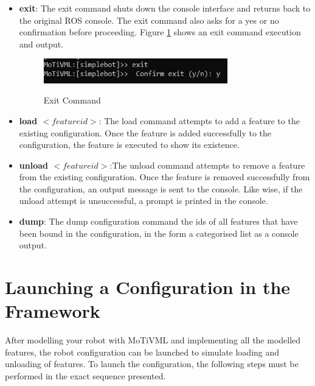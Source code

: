 \documentclass{article}
\begin{document}
\begin{itemize}
	\item \textbf{exit}: The exit command shuts down the console interface and returns back to the original ROS console. The exit command also asks for a yes or no confirmation before proceeding. Figure \ref{exit} shows an exit command execution and output.
	\begin{figure}[H]
		\caption{Exit Command}
		\centering
		\includegraphics[width=8cm]{images/exit.png}
		\label{exit}
	\end{figure}

	\item \textbf{load $<feature id>$}: The load command attempts to add a feature to the existing configuration. Once the feature is added successfully to the configuration, the feature is executed to show its existence.
	
	\item \textbf{unload $<feature id>$}:The unload command attempts to remove a feature from the existing configuration. Once the feature is removed successfully from the configuration, an output message is sent to the console. Like wise, if the unload attempt is unsuccessful, a prompt is printed in the console. 
	
	\item \textbf{dump}: The dump configuration command the ids of all features that have been bound in the configuration, in the form a categorised list as a console output.
\end{itemize}

\section{Launching a Configuration in the Framework}
After modelling your robot with MoTiVML and implementing all the modelled features, the robot configuration can be launched to simulate loading and unloading of features. To launch the configuration, the following steps must be performed in the exact sequence presented. 
\end{document}
